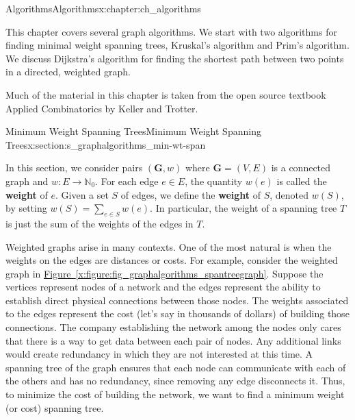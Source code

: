 \documentclass[oneside,10pt,]{book}
\newcommand{\xreffont}{\relax}
\newcommand{\terminology}[1]{\textbf{#1}}
\numberwithin{equation}{section}
\newcommand{\nonnegints}{\mathbb{N}_0}
\newcommand{\GVE}{\mathbf{G}=(V,E)}
\newcommand{\bfG}{\mathbf{G}}
\begin{document}
%
%
\typeout{************************************************}
\typeout{************************************************}
%
\begin{chapterptx}{Algorithms}{}{Algorithms}{}{}{x:chapter:ch_algorithms}
\begin{introduction}{}%
This chapter covers several graph algorithms.  We start with two algorithms for finding minimal weight spanning trees, Kruskal's algorithm and Prim's algorithm.  We discuss Dijkstra's algorithm for finding the shortest path between two points in a directed, weighted graph.%
\par
Much of the material in this chapter is taken from the open source textbook Applied Combinatorics by Keller and Trotter.%
\end{introduction}%
%
%
\typeout{************************************************}
\typeout{************************************************}
%
\begin{sectionptx}{Minimum Weight Spanning Trees}{}{Minimum Weight Spanning Trees}{}{}{x:section:s_graphalgorithms_min-wt-span}
\begin{introduction}{}%
In this section, we consider pairs \((\bfG,w)\) where \(\GVE\) is a connected graph and \(w\colon E\rightarrow\nonnegints\). For each edge \(e\in E\), the quantity \(w(e)\) is called the \terminology{weight} of \(e\). Given a set \(S\) of edges, we define the \terminology{weight} of \(S\), denoted \(w(S)\), by setting \(w(S)=\sum_{e\in S} w(e)\). In particular, the weight of a spanning tree \(T\) is just the sum of the weights of the edges in \(T\).%
\par
Weighted graphs arise in many contexts. One of the most natural is when the weights on the edges are distances or costs. For example, consider the weighted graph in \hyperref[x:figure:fig_graphalgorithms_spantreegraph]{Figure~{\xreffont\ref{x:figure:fig_graphalgorithms_spantreegraph}}}. Suppose the vertices represent nodes of a network and the edges represent the ability to establish direct physical connections between those nodes. The weights associated to the edges represent the cost (let's say in thousands of dollars) of building those connections. The company establishing the network among the nodes only cares that there is a way to get data between each pair of nodes. Any additional links would create redundancy in which they are not interested at this time. A spanning tree of the graph ensures that each node can communicate with each of the others and has no redundancy, since removing any edge disconnects it. Thus, to minimize the cost of building the network, we want to find a minimum weight (or cost) spanning tree.%

\end{introduction}
\end{sectionptx}
\end{chapterptx}
\end{document}
